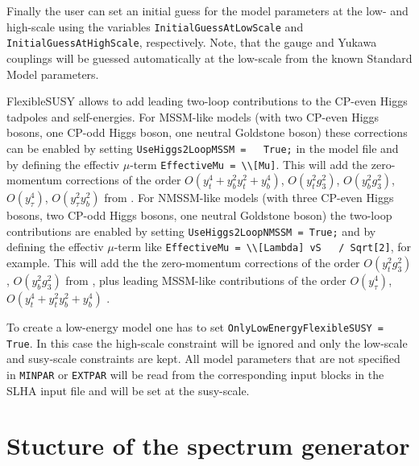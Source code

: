\documentclass[final,3p,times,pdflatex]{elsarticle}
\newcommand{\fs}{FlexibleSUSY\xspace}
\newcommand{\code}[1]{\lstinline|#1|}  %
\begin{document}
Finally the user can set an initial guess for the model parameters at
the low- and high-scale using the variables
\code{InitialGuessAtLowScale} and \code{InitialGuessAtHighScale},
respectively.  Note, that the gauge and Yukawa couplings will be
guessed automatically at the low-scale from the known Standard Model
parameters.

\fs allows to add leading two-loop contributions to the CP-even Higgs
tadpoles and self-energies.  For MSSM-like models (with two CP-even
Higgs bosons, one CP-odd Higgs boson, one neutral Goldstone boson)
these corrections can be enabled by setting \code{UseHiggs2LoopMSSM =
  True;} in the model file and by defining the effectiv $\mu$-term
\code{EffectiveMu = \\[Mu]}.  This will add the zero-momentum
corrections of the order $O(y_t^4 + y_b^2 y_t^2 + y_b^4)$, $O(y_t^2
g_3^2)$, $O(y_b^2 g_3^2)$, $O(y_\tau^4)$, $O(y_\tau^2 y_b^2)$ from
\cite{Degrassi:2001yf,Brignole:2001jy,Dedes:2002dy,Brignole:2002bz,Dedes:2003km}.
For NMSSM-like models (with three CP-even Higgs bosons, two CP-odd
Higgs bosons, one neutral Goldstone boson) the two-loop contributions
are enabled by setting \code{UseHiggs2LoopNMSSM = True;} and by
defining the effectiv $\mu$-term like \code{EffectiveMu = \\[Lambda] vS
  / Sqrt[2]}, for example.  This will add the the zero-momentum
corrections of the order $O(y_t^2 g_3^2)$, $O(y_b^2 g_3^2)$ from
\cite{Degrassi:2009yq}, plus leading MSSM-like contributions of the
order $O(y_\tau^4)$, $O(y_t^4 + y_t^2 y_b^2 + y_b^4)$
\cite{Brignole:2001jy,Dedes:2003km}.

To create a low-energy model one has to set
\code{OnlyLowEnergyFlexibleSUSY = True}.  In this case the high-scale
constraint will be ignored and only the low-scale and susy-scale
constraints are kept.  All model parameters that are not specified in
\code{MINPAR} or \code{EXTPAR} will be read from the corresponding
input blocks in the SLHA input file and will be set at the susy-scale.

\section{Stucture of the spectrum generator}
\end{document}
